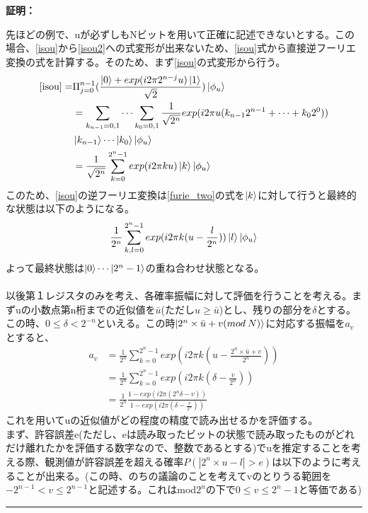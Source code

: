 \documentclass[a4paper,10.5pt]{article}
\numberwithin{equation}{section}
\newenvironment{proofbox}
{\begin{prooflabel}\textbf{証明：}\end{prooflabel}\vspace{0.8em}}
{\par\vspace{1em}\hrule\vspace{1em}}
\begin{document}
\begin{proofbox}
先ほどの例で、uが必ずしもNビットを用いて正確に記述できないとする。この場合、\eqref{isou}から\eqref{isou2}への式変形が出来ないため、\eqref{isou}式から直接逆フーリエ変換の式を計算する。そのため、まず\eqref{isou}の式変形から行う。
\begin{equation}\begin{split}
    \eqref{isou}=&\Pi_{j=0}^{n-1} (\frac{\ket{0}+exp(i2\pi 2^{n-j} u)\ket{1}}{\sqrt{2}})
    \ket{\phi_{u}}\\
    &=\sum_{k_{n-1}=0,1} \cdots \sum_{k_{0}=0,1} \frac{1}{\sqrt{2^{n}}}exp(i2\pi u(k_{n-1}2^{n-1}+\cdots+k_{0}2^{0}))\\
    &\ket{k_{n-1}}\cdots\ket{k_{0}}\ket{\phi_{u}} \\
    &=\frac{1}{\sqrt{2^{n}}}\sum_{k=0}^{2^{n}-1} exp(i2\pi ku)\ket{k}\ket{\phi_{u}}
\end{split} \end{equation}
このため、\eqref{isou}の逆フーリエ変換は\eqref{furie_two}の式を$\ket{k}$に対して行うと最終的な状態は以下のようになる。
\begin{equation}\begin{split}
    \frac{1}{2^{n}}\sum_{k,l=0}^{2^{n}-1}exp(i2\pi k(u-\frac{l}{2^{n}}))\ket{l}\ket{\phi_{u}}
\end{split} \end{equation}
よって最終状態は$\ket{0}\cdots\ket{2^{n}-1}$の重ね合わせ状態となる。\\
\\
以後第１レジスタのみを考え、各確率振幅に対して評価を行うことを考える。まずuの小数点第n桁までの近似値を$\bar{u}$(ただし$u\geq\bar{u}$)とし、残りの部分を$\delta$とする。この時、$0 \leq \delta <2^{-n}$といえる。この時$\ket{2^{n}\times \bar{u}+v(mod\:N)}$に対応する振幅を$a_{v}$とすると、
\begin{equation}\begin{split}
a_{v}&=\frac{1}{2^{n}}\sum_{k=0}^{2^{n}-1} exp(i2\pi k(u-\frac{2^{n}\times \bar{u}+v}{2^{n}}))\\
     &=\frac{1}{2^{n}}\sum_{k=0}^{2^{n}-1} exp(i2\pi k(\delta-\frac{v}{2^{n}}))\\
     &=\frac{1}{2^{n}}\frac{1-exp(i2\pi (2^{n}\delta-v))}{1-exp(i2\pi (\delta-\frac{v}{2^{n}}))}
\end{split} \end{equation}
これを用いてuの近似値がどの程度の精度で読み出せるかを評価する。\\
まず、許容誤差e(ただし、eは読み取ったビットの状態で読み取ったものがどれだけ離れたかを評価する数字なので、整数であるとする)でuを推定することを考える際、観測値が許容誤差を超える確率$P(|2^{n}\times u - l|>e)$は以下のように考えることが出来る。(この時、のちの議論のことを考えてvのとりうる範囲を$-2^{n-1} < v\leq 2^{n-1}$と記述する。これはmod$2^{n}$の下で$0\leq v \leq 2^{n}-1$と等価である)

\end{proofbox}
\end{document}
